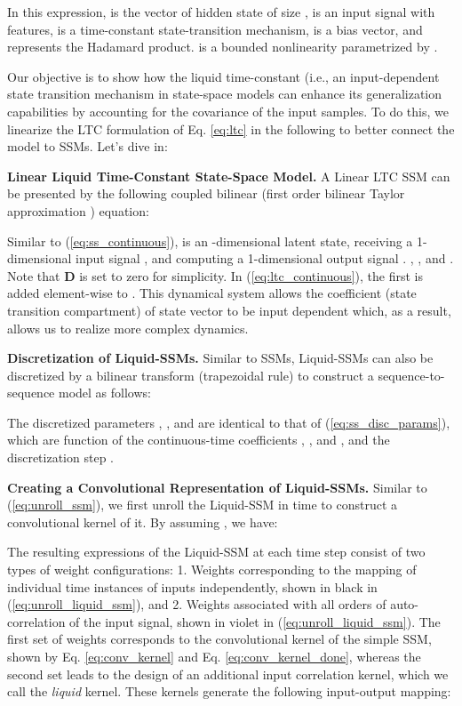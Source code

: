 \documentclass{MITcsail}
\begin{document}
In this expression,  is the vector of hidden state of size ,  is an input signal with  features,  is a time-constant state-transition mechanism,  is a bias vector, and  represents the Hadamard product.  is a bounded nonlinearity parametrized by . 

Our objective is to show how the liquid time-constant (i.e., an input-dependent state transition mechanism in state-space models can enhance its generalization capabilities by accounting for the covariance of the input samples. To do this, we linearize the LTC formulation of Eq. \ref{eq:ltc} in the following to better connect the model to SSMs. Let's dive in:

\noindent \textbf{Linear Liquid Time-Constant State-Space Model.} A Linear LTC SSM can be presented by the following coupled bilinear (first order bilinear Taylor approximation \citep{penny2005bilinear}) equation:

\begingroup
\small

\endgroup

Similar to (\ref{eq:ss_continuous}),  is an -dimensional latent state, receiving a 1-dimensional input signal , and computing a 1-dimensional output signal . , , and . Note that \textbf{D} is set to zero for simplicity. In (\ref{eq:ltc_continuous}), the first  is added element-wise to . This dynamical system allows the coefficient (state transition compartment) of state vector  to be input dependent which, as a result, allows us to realize more complex dynamics. 

\noindent \textbf{Discretization of Liquid-SSMs.} Similar to SSMs, Liquid-SSMs can also be discretized by a bilinear transform (trapezoidal rule) to construct a sequence-to-sequence model as follows:

\begingroup
\small

\endgroup

The discretized parameters , , and  are identical to that of (\ref{eq:ss_disc_params}), which are function of the continuous-time coefficients , , and , and the discretization step .

\noindent \textbf{Creating a Convolutional Representation of Liquid-SSMs.} Similar to (\ref{eq:unroll_ssm}), we first unroll the Liquid-SSM in time to construct a convolutional kernel of it. By assuming , we have:

\begingroup
\footnotesize

\endgroup

The resulting expressions of the Liquid-SSM at each time step consist of two types of weight configurations: 1. Weights corresponding to the mapping of individual time instances of inputs independently, shown in black in (\ref{eq:unroll_liquid_ssm}), and 2. Weights associated with all orders of auto-correlation of the input signal, shown in violet in (\ref{eq:unroll_liquid_ssm}). 
The first set of weights corresponds to the convolutional kernel of the simple SSM, shown by Eq. \ref{eq:conv_kernel} and Eq. \ref{eq:conv_kernel_done}, whereas the second set leads to the design of an additional input correlation kernel, which we call the \emph{liquid} kernel. These kernels generate the following input-output mapping:
\begingroup
\footnotesize
\end{document}
